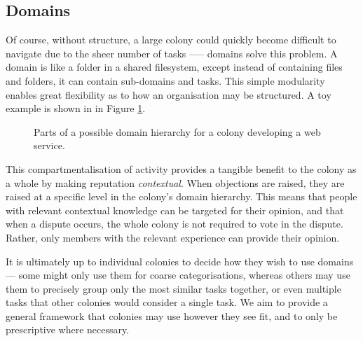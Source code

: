 \subsection{Domains}\label{sec:domains}

Of course, without structure, a large colony could quickly become difficult to navigate due to the sheer number of tasks —-- domains solve this problem. A domain is like a folder in a shared filesystem, except instead of containing files and folders, it can contain sub-domains and tasks. This simple modularity enables great flexibility as to how an organisation may be structured. A toy example is shown in in Figure \ref{fig:domainhierarchysample}.

\begin{figure}[h]
    \centering
 \caption{Parts of a possible domain hierarchy for a colony developing a web service.}
 \label{fig:domainhierarchysample}

\end{figure}

This compartmentalisation of activity provides a tangible benefit to the colony as a whole by making reputation \textit{contextual}. When objections are raised, they are raised at a specific level in the colony's domain hierarchy. This means that people with relevant contextual knowledge can be targeted for their opinion, and that when a dispute occurs, the whole colony is not required to vote in the dispute. Rather, only members with the relevant experience can provide their opinion.

It is ultimately up to individual colonies to decide how they wish to use domains --- some might only use them for coarse categorisations, whereas others may use them to precisely group only the most similar tasks together, or even multiple tasks that other colonies would consider a single task. We aim to provide a general framework that colonies may use however they see fit, and to only be prescriptive where necessary.

